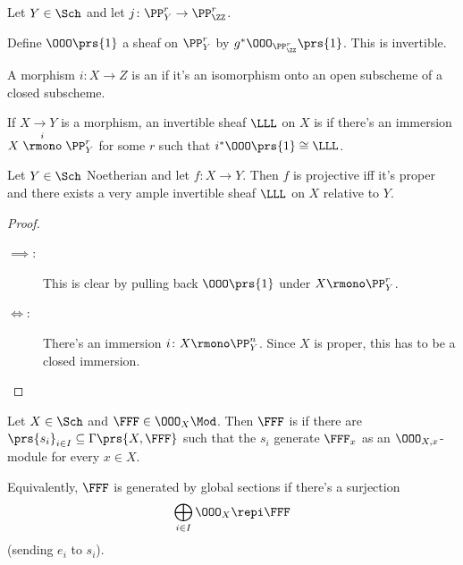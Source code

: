 \documentclass[10pt,a4paper,twoside,openany,hidelinks]{book}
\begin{document}
\begin{definition}
Let $Y \in \Sch$ and let $j \colon \PP_Y^r \to \PP_\ZZ^r$.

Define $\OOO\prs{1}$ a sheaf on $\PP_Y^r$ by $g^* \OOO_{\PP^r_\ZZ}\prs{1}$. This is invertible.
\end{definition}

\begin{definition}[Immersion]
A morphism $i \colon X \to Z$ is an  if it's an isomorphism onto an open subscheme of a closed subscheme.
\end{definition}

\begin{definition}
If $X \to Y$ is a morphism, an invertible sheaf $\LLL$ on $X$ is  if there's an immersion
$X \stackrel{i}{\rmono} \PP_Y^r$ for some $r$ such that $i^*\OOO\prs{1} \cong \LLL$.
\end{definition}

\begin{lemma}
Let $Y \in \Sch$ Noetherian and let $f \colon X \to Y$. Then $f$ is projective iff it's proper and there exists a very ample invertible sheaf $\LLL$ on $X$ relative to $Y$.
\end{lemma}

\begin{proof}
\begin{description}
\item[$\implies$:] This is clear by pulling back $\OOO\prs{1}$ under $X \rmono \PP_Y^r$.
\item[$\Leftrightarrow$:]
There's an immersion $i \colon X \rmono \PP_Y^n$. Since $X$ is proper, this has to be a closed immersion.
\end{description}
\end{proof}

\begin{definition}
Let $X \in \Sch$ and $\FFF \in \OOO_X\Mod$. Then $\FFF$ is  if there are $\prs{s_i}_{i \in I} \subseteq \Gamma\prs{X, \FFF}$ such that the $s_i$ generate $\FFF_x$ as an $\OOO_{X,x}$-module for every $x \in X$.
\end{definition}

\begin{remark}
Equivalently, $\FFF$ is generated by global sections if there's a surjection
\[\bigoplus_{i \in I} \OOO_X \repi \FFF\]
(sending $e_i$ to $s_i$).
\end{remark}
\end{document}
